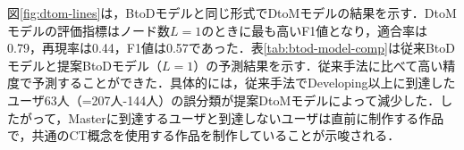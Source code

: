 \documentclass[submit]{ipsj}
\begin{document}

図\ref{fig:dtom-lines}は，BtoDモデルと同じ形式でDtoMモデルの結果を示す．DtoMモデルの評価指標はノード数$L=1$のときに最も高いF1値となり，適合率は0.79，再現率は0.44，F1値は0.57であった．表\ref{tab:btod-model-comp}は従来BtoDモデルと提案BtoDモデル（$L=1$）の予測結果を示す．従来手法に比べて高い精度で予測することができた．具体的には，従来手法でDeveloping以上に到達したユーザ63人（=207人-144人）の誤分類が提案DtoMモデルによって減少した．したがって，Masterに到達するユーザと到達しないユーザは直前に制作する作品で，共通のCT概念を使用する作品を制作していることが示唆される．


\end{document}
